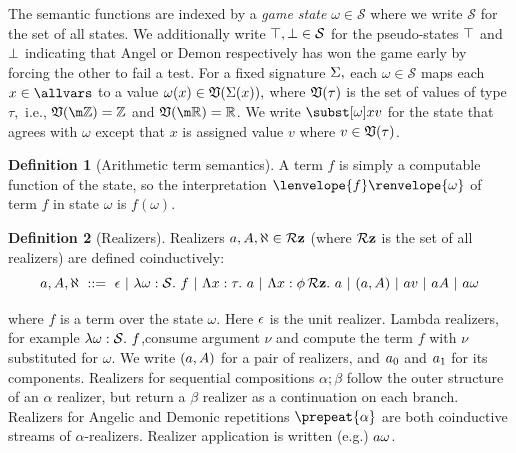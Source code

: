 \documentclass[12pt]{cmuthesis}
\theoremstyle{definition}
\newtheorem{definition}{Definition}
\theoremstyle{remark}
\newcommand{\bebecomes}{\mathrel{::=}}
\newcommand{\alternative}{~|~}
\newcommand{\allstate}{\mathcal{S}}
\newcommand{\om}{\omega}
\newcommand{\tint}[2]{\lenvelope{#1}\renvelope{#2}}
\begin{document}
The semantic functions are indexed by  a \emph{game state} $\om \in \allstate$ where we write $\allstate$ for the set of all states.
We additionally write $\stt, \sff \in \allstate$ for the pseudo-states $\top$ and $\bot$ indicating that Angel or Demon respectively has won the game early by forcing the other to fail a test.
For a fixed signature $\Sigma,$ each $\om \in \allstate$ maps each $x \in \allvars$ to a value $\om(x) \in \valset{\sig{x}},$ where $\mathfrak{V}(\tau)$ is the set of values of type $\tau,$ i.e., $\valset{\kwint} = \mathbb{Z}$ and $\valset{\kwreal} = \mathbb{R}$.
We write $\ssub{\om}{x}{v}$ for the state that agrees with $\om$ except that $x$ is assigned value $v$ where $v \in \mathfrak{V}(\tau)$.
\begin{definition}[Arithmetic term semantics]
\label{def:term-sem}
A term $f$ is simply a computable function of the state, so the interpretation $\tint{f}{\om}$ of term $f$ in state $\om$ is $f(\om)$.
\end{definition}
\begin{definition}[Realizers] 
Realizers $a,A,\aleph \in \mathcal{R}\mathbf{z}$ (where $\mathcal{R}\mathbf{z}$ is the set of all realizers) are defined coinductively:
\[\aa,\ab,\ac ~\bebecomes~ \rzNil \alternative \rzBLam{\om}{f} \alternative \rzFOLam{x}{\tau}{\aa} \alternative \rzHOLam{x}{\phi}{\aa} \alternative \rzCons{\aa}{\ab}\alternative \rzApp{\aa}{v} \alternative \rzApp{\aa}{\ab} \alternative \rzApp{\aa}{\om}\]
\end{definition} 
where $f$ is a term over the state $\om$.
Here $\epsilon$ is the unit realizer.
Lambda realizers, for example  $\rzBLam{\om}{f}$,consume argument $\nu$ and compute the term $f$ with $\nu$ substituted for $\om$.
We write $(a,A)$ for a pair of realizers, and $a_0$ and $a_1$ for its components.
Realizers for sequential compositions $\alpha;\beta$ follow the outer structure of an $\alpha$ realizer, but return a $\beta$ realizer as a continuation on each branch.
Realizers for Angelic and Demonic repetitions $\prepeat{\alpha}$ are both coinductive streams of $\alpha$-realizers.
Realizer application is written (e.g.) $\rzApp{\aa}{\om}$.
\end{document}
